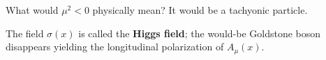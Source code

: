 \documentclass[main.tex]{subfiles}
\begin{document}



What would \(\mu^2<0\) physically mean? It would be a tachyonic particle.

The field \(\sigma (x)\) is called the \textbf{Higgs field}; the would-be Goldstone boson disappears yielding the longitudinal polarization of \(A_{\mu } (x)\). 








\end{document}
